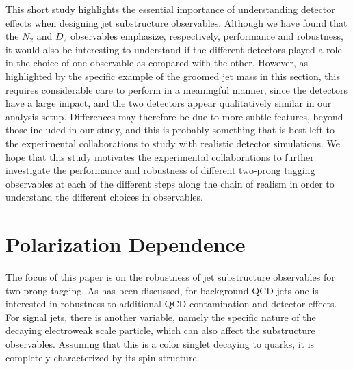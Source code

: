 \documentclass[11pt,letterpaper]{article}
\begin{document}
This short study highlights the essential importance of understanding detector effects when designing jet substructure observables. Although we have found that the $N_2$ and $D_2$ observables emphasize, respectively, performance and robustness, it would also be interesting to understand if the different detectors played a role in the choice of one observable as compared with the other. However, as highlighted by the specific example of the groomed jet mass in this section, this requires considerable care to perform in a meaningful manner, since the detectors have a large impact, and the two detectors appear qualitatively similar in our analysis setup. Differences may therefore be due to more subtle features, beyond those included in our study, and this is probably something that is best left to the experimental collaborations to study with realistic detector simulations. We hope that this study motivates the experimental collaborations to further investigate the performance and robustness of different two-prong tagging observables at each of the different steps along the chain of realism in order to understand the different choices in observables.



\section{Polarization Dependence}\label{sec:polar}




The focus of this paper is on the robustness of jet substructure
observables for two-prong tagging.
%
As has been discussed, for
background QCD jets one is interested in robustness to additional QCD
contamination and detector effects. For signal jets, there is another variable, namely the specific nature of the decaying electroweak scale particle, which can also affect the substructure observables.
%
Assuming
that this is a color singlet decaying to quarks, it is completely
characterized by its spin structure.
%
\end{document}
